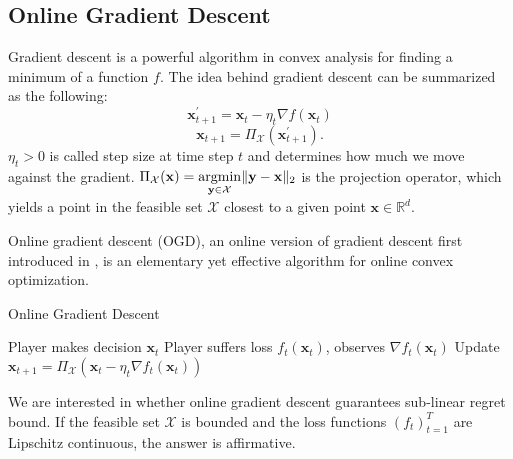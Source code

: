 \documentclass[12pt, a4paper]{report}
\begin{document}
\subsection{Online Gradient Descent}
Gradient descent is a powerful algorithm in convex analysis for finding a minimum of a function $f$. The idea behind gradient descent can be summarized as the following:
\begin{equation*}
    \mathbf{x}_{t+1}^\prime = \mathbf{x}_t - \eta_t \nabla f(\mathbf{x}_t)
\end{equation*}
\begin{equation*}
    \mathbf{x}_{t+1} = \Pi_\mathcal{X} (\mathbf{x}_{t+1}^\prime).
\end{equation*}    
$\eta_t > 0$ is called step size at time step $t$ and determines how much we move against the gradient. $\displaystyle \Pi_\mathcal{X}(\mathbf{x}) = \operatorname*{argmin}_{\mathbf{y} \in \mathcal{X}} \lVert \mathbf{y} - \mathbf{x} \rVert_{2}$ is the projection operator, which yields a point in the feasible set $\mathcal{X}$ closest to a given point $\mathbf{x} \in \mathbb{R}^d$. 

Online gradient descent (OGD), an online version of gradient descent first introduced in \cite{Zinkevich2003OnlineCP}, is an elementary yet effective algorithm for online convex optimization. 
\begin{algorithm}
\caption{Online Gradient Descent}\label{alg:ogd}
\begin{algorithmic}[1]
\State Player makes decision $\mathbf{x}_t$
\State Player suffers loss $f_t(\mathbf{x}_t)$, observes $\nabla f_t(\mathbf{x}_t)$
\State Update $\mathbf{x}_{t+1} = \Pi_{\mathcal{X}} (\mathbf{x}_t - \eta_t \nabla f_t(\mathbf{x}_t))$
\EndFor
\end{algorithmic}
\end{algorithm}

We are interested in whether online gradient descent guarantees sub-linear regret bound. If the feasible set $\mathcal{X}$ is bounded and the loss functions $(f_t)_{t=1}^T$ are Lipschitz continuous, the answer is affirmative.
\end{document}
